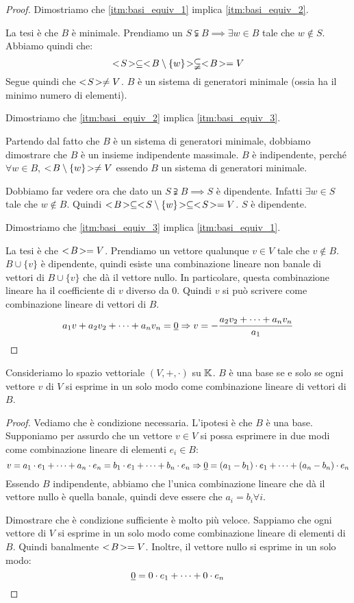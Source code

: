 \begin{proof}
Dimostriamo che \ref{itm:basi_equiv_1} implica \ref{itm:basi_equiv_2}.

La tesi \`e che $B$ \`e minimale. Prendiamo un $S \subsetneqq B \implies \exists w \in B$ tale che $w \notin S$. Abbiamo quindi che:
\[
<\!{S}\!> \subseteq <\!{B \setminus \{w\}}\!> \subsetneqq <\!{B}\!> = V
\]
Segue quindi che $<\!{S}\!> \neq V$. $B$ \`e un sistema di generatori minimale (ossia ha il minimo numero di elementi).

Dimostriamo che \ref{itm:basi_equiv_2} implica \ref{itm:basi_equiv_3}.

Partendo dal fatto che $B$ \`e un sistema di generatori minimale, dobbiamo dimostrare che $B$ \`e un insieme indipendente massimale. $B$ \`e indipendente, perch\'e $\forall w \in B$, $<\!{B \setminus \{ w \}}\!> \neq V$ essendo $B$ un sistema di generatori minimale.

Dobbiamo far vedere ora che dato un $S \supsetneqq B \implies S$ \`e dipendente. Infatti $\exists w \in S$ tale che $w \notin B$. Quindi $<\!{B}\!> \subseteq <\!{S \setminus \{w\}}\!> \subseteq <\!{S}\!> = V$. $S$ \`e dipendente.

Dimostriamo che \ref{itm:basi_equiv_3} implica \ref{itm:basi_equiv_1}.

La tesi \`e che $<\!{B}\!> = V$. Prendiamo un vettore qualunque $v \in V$ tale che $v \notin B$. $B \cup \{ v \}$ \`e dipendente, quindi esiste una combinazione lineare non banale di vettori di $B \cup \{ v \}$ che d\`a il vettore nullo. In particolare, questa combinazione lineare ha il coefficiente di $v$ diverso da 0. Quindi $v$ si pu\`o scrivere come combinazione lineare di vettori di $B$.
\[
a_1 v + a_2 v_2 + \dots + a_n v_n = \underline{0} \Rightarrow
v = - \frac{a_2 v_2 + \dots + a_n v_n}{a_1}
\]
\end{proof}

\begin{prop}
Consideriamo lo spazio vettoriale $(V, +, \cdot)$ su $\mathbb{K}$. $B$ \`e una base se e solo se ogni vettore $v$ di $V$ si esprime in un solo modo come combinazione lineare di vettori di $B$.
\end{prop}
\begin{proof}
Vediamo che \`e condizione necessaria. L'ipotesi \`e che $B$ \`e una base. Supponiamo per assurdo che un vettore $v \in V$ si possa esprimere in due modi come combinazione lineare di elementi $e_i \in B$:
\[
v = a_1 \cdot e_1 + \dots + a_n \cdot e_n = b_1 \cdot e_1 + \dots + b_n \cdot e_n \Rightarrow
\underline{0} = (a_1 - b_1) \cdot e_1 + \dots + (a_n - b_n) \cdot e_n
\]
Essendo $B$ indipendente, abbiamo che l'unica combinazione lineare che d\`a il vettore nullo \`e quella banale, quindi deve essere che $a_i = b_i \forall i$.

Dimostrare che \`e condizione sufficiente \`e molto pi\`u veloce. Sappiamo che ogni vettore di $V$ si esprime in un solo modo come combinazione lineare di elementi di $B$. Quindi banalmente $<\!{B}\!> = V$. Inoltre, il vettore nullo si esprime in un solo modo:
\[
\underline{0} = 0 \cdot e_1 + \dots + 0 \cdot e_n
\]
\end{proof}

